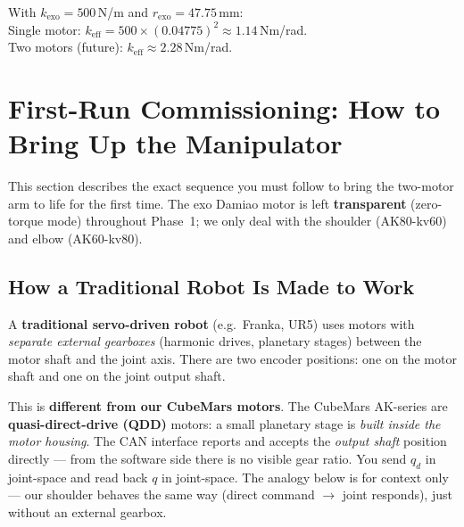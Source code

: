 \documentclass[11pt,a4paper]{article}
\begin{document}
\begin{resultbox}
  With $k_{\mathrm{exo}}{=}500$\,N/m and $r_{\mathrm{exo}}{=}47.75$\,mm:\\  
  Single motor: $k_{\mathrm{eff}} = 500\times(0.04775)^2 \approx 1.14$\,Nm/rad.\\  
  Two motors (future): $k_{\mathrm{eff}} \approx 2.28$\,Nm/rad.
\end{resultbox}


\section{First-Run Commissioning: How to Bring Up the Manipulator}
\label{sec:commissioning}

This section describes the exact sequence you must follow to bring the
two-motor arm to life for the first time.  The exo Damiao motor is left
\textbf{transparent} (zero-torque mode) throughout Phase~1; we only deal
with the shoulder (AK80-kv60) and elbow (AK60-kv80).

\subsection{How a Traditional Robot Is Made to Work}
\label{sec:traditional}

A \textbf{traditional servo-driven robot} (e.g.\ Franka, UR5) uses motors with
\emph{separate external gearboxes} (harmonic drives, planetary stages) between the
motor shaft and the joint axis.  There are two encoder positions: one on the motor
shaft and one on the joint output shaft.

This is \textbf{different from our CubeMars motors}.  The CubeMars AK-series are
\textbf{quasi-direct-drive (QDD)} motors: a small planetary stage is
\emph{built inside the motor housing}.  The CAN interface reports and accepts
the \emph{output shaft} position directly --- from the software side there is
no visible gear ratio.  You send $q_d$ in joint-space and read back $q$ in
joint-space.  The analogy below is for context only --- our shoulder behaves
the same way (direct command $\to$ joint responds), just without an external gearbox.
\end{document}
